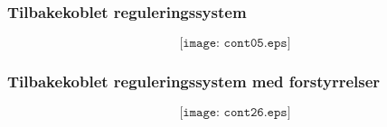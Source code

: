 \documentclass{beamer}
\begin{document}
%
%
%
%
%
%
%
%
%
%
\begin{frame}
	\frametitle{Tilbakekoblet reguleringssystem}

	
$$\texttt{[image: cont05.eps]}$$

\end{frame}


%
%
\begin{frame}
	\frametitle{Tilbakekoblet reguleringssystem med forstyrrelser}

	
$$\texttt{[image: cont26.eps]}$$

\end{frame}
\end{document}
